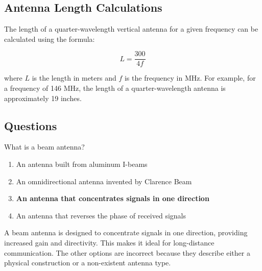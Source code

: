 \subsection*{Antenna Length Calculations}
The length of a quarter-wavelength vertical antenna for a given frequency can be calculated using the formula:

\begin{equation}
    L = \frac{300}{4f}
    \label{eq:antenna_length}
\end{equation}

where \( L \) is the length in meters and \( f \) is the frequency in MHz. For example, for a frequency of 146 MHz, the length of a quarter-wavelength antenna is approximately 19 inches.

\subsection*{Questions}

\begin{tcolorbox}[colback=gray!10!white,colframe=black!75!black,title={T9A01}]
    What is a beam antenna?
    \begin{enumerate}[label=\Alph*),noitemsep]
        \item An antenna built from aluminum I-beams
        \item An omnidirectional antenna invented by Clarence Beam
        \item \textbf{An antenna that concentrates signals in one direction}
        \item An antenna that reverses the phase of received signals
    \end{enumerate}
\end{tcolorbox}
A beam antenna is designed to concentrate signals in one direction, providing increased gain and directivity. This makes it ideal for long-distance communication. The other options are incorrect because they describe either a physical construction or a non-existent antenna type.


